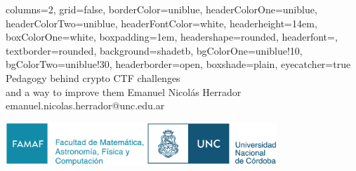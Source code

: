 \documentclass[a0paper,portrait]{baposter}
\begin{document}
\begin{poster}{
  columns=2,
	grid=false,
	borderColor=uniblue,
	headerColorOne=uniblue,
	headerColorTwo=uniblue,
	headerFontColor=white,
  headerheight=14em,
	boxColorOne=white,
  boxpadding=1em,
	headershape=rounded,
	headerfont=\Large\textsf,
	textborder=rounded,
	background=shadetb,
  bgColorOne=uniblue!10,
  bgColorTwo=uniblue!30,
	headerborder=open,
  boxshade=plain,
  eyecatcher=true
}
{
}
{\smaller Pedagogy behind crypto CTF challenges \\ and a way to improve them}
{
  \vspace{1em}
  Emanuel Nicolás Herrador\\
	{\smaller emanuel.nicolas.herrador@unc.edu.ar}
}
{\begin{minipage}{28.0em}
    \includegraphics[height=4.4em]{famaf-unc-logo.png}
  \end{minipage}
}

\end{poster}
\end{document}
